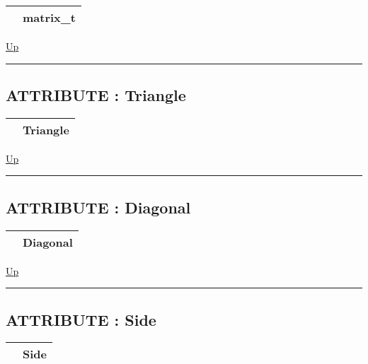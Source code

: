{\renewcommand{\arraystretch}{1.5}
\begin{tabularx}{\textwidth}{|>{\raggedright\arraybackslash}l|X|}
\hline
\hspace{0pt} & matrix\_t \\
\hline
\end{tabularx}
}

\hyperlink{ecldoc:BLAS.Types}{Up}

\par


\rule{\textwidth}{0.4pt}
\subsection*{ATTRIBUTE : Triangle}
\hypertarget{ecldoc:ecldoc-Triangle}{}

{\renewcommand{\arraystretch}{1.5}
\begin{tabularx}{\textwidth}{|>{\raggedright\arraybackslash}l|X|}
\hline
\hspace{0pt} & Triangle \\
\hline
\end{tabularx}
}

\hyperlink{ecldoc:BLAS.Types}{Up}

\par


\rule{\textwidth}{0.4pt}
\subsection*{ATTRIBUTE : Diagonal}
\hypertarget{ecldoc:ecldoc-Diagonal}{}

{\renewcommand{\arraystretch}{1.5}
\begin{tabularx}{\textwidth}{|>{\raggedright\arraybackslash}l|X|}
\hline
\hspace{0pt} & Diagonal \\
\hline
\end{tabularx}
}

\hyperlink{ecldoc:BLAS.Types}{Up}

\par


\rule{\textwidth}{0.4pt}
\subsection*{ATTRIBUTE : Side}
\hypertarget{ecldoc:ecldoc-Side}{}

{\renewcommand{\arraystretch}{1.5}
\begin{tabularx}{\textwidth}{|>{\raggedright\arraybackslash}l|X|}
\hline
\hspace{0pt} & Side \\
\hline
\end{tabularx}
}

